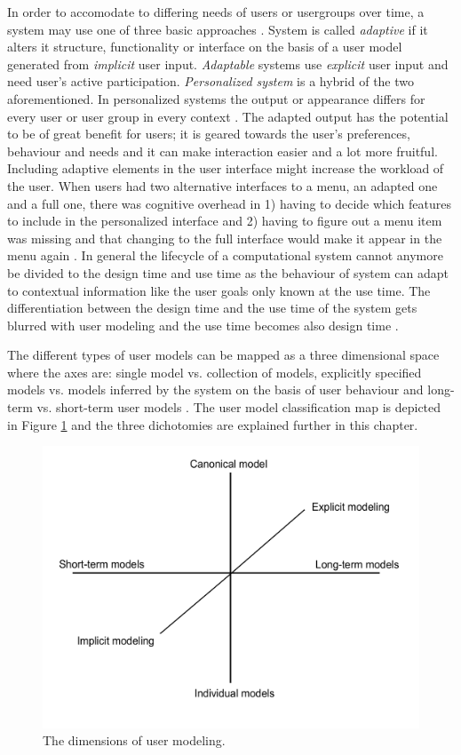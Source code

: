 \documentclass{sigchi}
\begin{document}
In order to accomodate to differing needs of users or usergroups over time, a system may use one of three basic approaches \cite{van08}. System is called \textit{adaptive} if it alters it structure, functionality or interface on the basis of a user model generated from \textit{implicit} user input. \textit{Adaptable} systems use \textit{explicit} user input and need user's active participation. \textit{Personalized system} is a hybrid of the two aforementioned. In personalized systems the output or appearance differs for every user or user group in every context \cite{van08}. The adapted output has the potential to be of great benefit for users; it is geared towards the user's preferences, behaviour and needs and it can make interaction easier and a lot more fruitful. Including adaptive elements in the user interface might increase the workload of the user. When users had two alternative interfaces to a menu, an adapted one and a full one, there was cognitive overhead in 1) having to decide which features to include in the personalized interface and 2) having to figure out a menu item was missing and that changing to the full interface would make it appear in the menu again \cite{bunt04}. In general the lifecycle of a computational system cannot anymore be divided to the design time and use time as the behaviour of system can adapt to contextual information like the user goals only known at the use time. The differentiation between the design time and the use time of the system gets blurred with user modeling and the use time becomes also design time \cite{fischer01}.

The different types of user models can be mapped as a three dimensional space where the axes are: single model vs. collection of models, explicitly specified models vs. models inferred by the system on the basis of user behaviour and long-term vs. short-term user models \cite{rich99}. The user model classification map is depicted in Figure \ref{dim_UM} and the three dichotomies are explained further in this chapter. 

\begin{figure}[htp] %
\caption{The dimensions of user modeling.} \label{dim_UM}
\includegraphics[scale=0.4]{figures/dimensions_UM.pdf} 
\end{figure}
\end{document}
